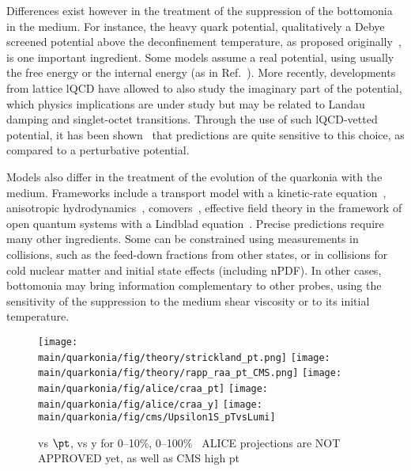 \documentclass[../report.tex]{subfiles}
\providecommand{\main}{..}
\begin{document}
Differences exist however in the treatment of the suppression of the bottomonia in the medium.
For instance, the heavy quark potential, qualitatively a Debye screened potential above the deconfinement temperature, as proposed originally~\cite{Matsui:1986dk}, is one important
ingredient. Some models assume a real potential, using usually the free energy or the internal energy (as in Ref.~\cite{Du:2017qkv}). More recently, developments from lattice lQCD
have allowed to also study the imaginary part of the potential, which physics implications are under study but may be related to Landau damping and singlet-octet transitions. Through the 
use of such lQCD-vetted potential, it has been shown~\cite{Krouppa:2017jlg} that predictions are quite sensitive to this choice, as compared to a perturbative potential. 

Models also differ in the treatment of the evolution of the quarkonia with the medium. Frameworks include a transport model with a kinetic-rate equation~\cite{Du:2017qkv},
anisotropic hydrodynamics~\cite{Krouppa:2017jlg}, comovers~\cite{Ferreiro:2018wbd}, effective field theory in the framework of open quantum systems with 
a Lindblad equation~\cite{Brambilla:2017zei}. Precise predictions require many other ingredients. Some can be constrained using measurements in \pp collisions, such as
the feed-down fractions from other states, or in \pPb collisions for cold nuclear matter and initial state effects (including nPDF). In other cases, bottomonia may bring information
complementary to other probes, using the sensitivity of the suppression to the medium shear viscosity or to its initial temperature.

\begin{figure}
\begin{center}
 \texttt{[image: \\main/quarkonia/fig/theory/strickland\_pt.png]}
 \texttt{[image: \\main/quarkonia/fig/theory/rapp\_raa\_pt\_CMS.png]}
 \texttt{[image: \\main/quarkonia/fig/alice/craa\_pt]}
 \texttt{[image: \\main/quarkonia/fig/alice/craa\_y]}
 \texttt{[image: \\main/quarkonia/fig/cms/Upsilon1S\_pTvsLumi]}
\end{center}

 \caption{\raa vs $\pt$, \raa vs y for 0--10\%, 0--100\%~\cite{Krouppa:2017jlg,Du:2017qkv} ALICE projections are NOT APPROVED yet, as well as CMS high pt
 }
 \label{fig:upsi_raa_pt_y}
\end{figure}
\end{document}
